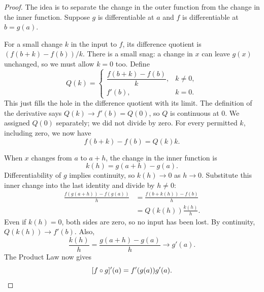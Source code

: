 \begin{proof}
The idea is to separate the change in the outer function from the
change in the inner function. Suppose $g$ is differentiable at $a$ and
$f$ is differentiable at $b=g(a)$.

For a small change $k$ in the input to $f$, its difference quotient
is $(f(b+k)-f(b))/k$. There is a small snag: a change in $x$ can leave
$g(x)$ unchanged, so we must allow $k=0$ too. Define
$$
Q(k)=
\begin{cases}
\dfrac{f(b+k)-f(b)}k,&k\ne0,\\[6pt]
f'(b),&k=0.
\end{cases}
$$
This just fills the hole in the difference quotient with its limit.
The definition of the derivative says $Q(k)\to f'(b)=Q(0)$, so $Q$
is continuous at 0. We assigned $Q(0)$ separately; we did not divide by zero.
For every permitted $k$, including zero, we now have
$$f(b+k)-f(b)=Q(k)k.$$

When $x$ changes from $a$ to $a+h$, the change in the inner function is
$$k(h)=g(a+h)-g(a).$$
Differentiability of $g$ implies continuity, so $k(h)\to0$ as $h\to0$.
Substitute this inner change into the last identity and divide by $h\ne0$:
\begin{align*}
\frac{f(g(a+h))-f(g(a))}h
&=\frac{f(b+k(h))-f(b)}h\\
&=Q(k(h))\frac{k(h)}h.
\end{align*}
Even if $k(h)=0$, both sides are zero, so no input has been lost.
By continuity, $Q(k(h))\to f'(b)$. Also,
$$\frac{k(h)}h=\frac{g(a+h)-g(a)}h\longrightarrow g'(a).$$
The Product Law now gives
\[
[f\circ g]'(a)=f'(g(a))g'(a).
\qedhere
\]
\end{proof}

\label{sec:power-rule-proof}

